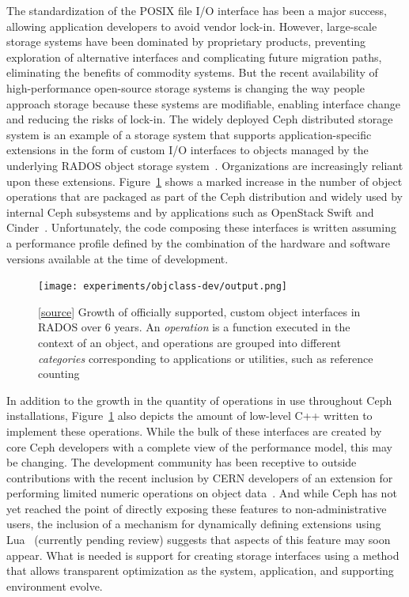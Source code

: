 \documentclass[10pt,twocolumn]{article}
\begin{document}

The standardization of the POSIX file I/O interface has been a major success,
allowing application developers to avoid vendor lock-in. However, large-scale
storage systems have been dominated by proprietary products, preventing
exploration of alternative interfaces and complicating future migration paths,
eliminating the benefits of commodity systems. But the recent availability of
high-performance open-source storage systems is changing the way people
approach storage because these
systems are modifiable, enabling interface change and reducing the risks of
lock-in. The widely deployed Ceph distributed storage system is an example of
a storage system that supports application-specific extensions in the form of
custom I/O interfaces to objects managed by the underlying RADOS object
storage system~\cite{weil:osdi06,weil:pdsw07}. Organizations are increasingly
reliant upon these extensions. Figure~\ref{fig:objclass-dev} shows
a marked increase in the number of object operations that are packaged as part
of the Ceph distribution and widely used by internal Ceph subsystems and by
applications such as OpenStack Swift and Cinder~\cite{openstack}.
Unfortunately, the code composing these interfaces
is written assuming a performance profile defined by the combination of the
hardware and software versions available at the time of development.

\begin{figure}[t]
  \centering
    \texttt{[image: experiments/objclass-dev/output.png]}
    \caption{
[\href{https://github.com/noahdesu/zlog-popper/tree/master/experiments/objclass-dev/visualize.ipynb}{source}]
Growth of officially supported, custom object interfaces in RADOS over 6
years. An \emph{operation} is a function executed in the context of an object,
and operations are grouped into different \emph{categories}
corresponding to applications or utilities, such as reference counting}
\label{fig:objclass-dev}
\end{figure}

In addition to the growth in the quantity of operations in use throughout Ceph
installations, Figure~\ref{fig:objclass-dev} also depicts the amount of
low-level C++ written to implement these operations.
While
the bulk of these interfaces are created by core Ceph developers with a
complete view of the performance model, this may be changing. The
development community has been receptive to outside contributions with the
recent inclusion by CERN developers of an extension for performing limited
numeric operations on object data~\cite{cls_numops}. And while Ceph has not
yet reached the point of directly exposing these features to
non-administrative users, the inclusion of a mechanism for dynamically
defining extensions using Lua~\cite{cls_lua} (currently pending review)
suggests that aspects of this
feature may soon appear. What is needed is support for creating storage
interfaces using a method that allows transparent optimization as the system,
application, and supporting environment evolve.
\end{document}
